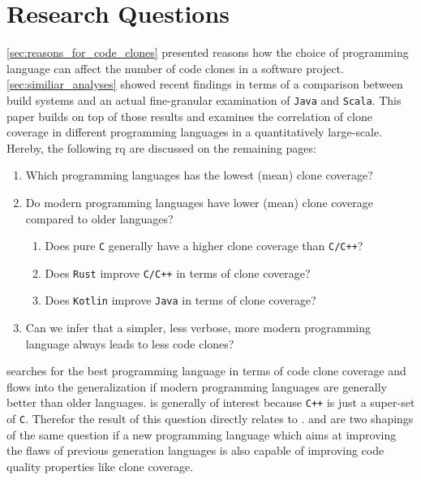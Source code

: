 
\section{Research Questions}
\label{sec:research_question}

\autoref{sec:reasons_for_code_clones} presented reasons how the choice of programming language can affect the number of code clones in a software project. \autoref{sec:similiar_analyses} showed recent findings in terms of a comparison between build systems and an actual fine-granular examination of \texttt{Java} and \texttt{Scala}.
This paper builds on top of those results and examines the correlation of clone coverage in different programming languages in a quantitatively large-scale. Hereby, the following \ac{rq} are discussed on the remaining pages:

\begin{enumerate}
	\item Which programming languages has the lowest (mean) clone coverage? \label{question:clone_coverage_lowest}
	\item Do modern programming languages have lower (mean) clone coverage compared to older languages? \label{question:comparing_age}
	\begin{enumerate}
		\item Does pure \texttt{C} generally have a higher clone coverage than \texttt{C/C++}? \label{question:compare_c_cpp}
		\item Does \texttt{Rust} improve \texttt{C/C++} in terms of clone coverage? \label{question:compare_rust_c}
		\item Does \texttt{Kotlin} improve \texttt{Java} in terms of clone coverage? \label{question:compare_kotlin_java}
	\end{enumerate}
	\item Can we infer that a simpler, less verbose, more modern programming language always leads to less code clones? \label{question:always_less_clones}
\end{enumerate}

 searches for the best programming language in terms of code clone coverage and flows into the generalization if modern programming languages are generally better than older languages.
 is generally of interest because \texttt{C++} is just a super-set of \texttt{C}. Therefor the result of this question directly relates to .  and  are two shapings of the same question if a new programming language which aims at improving the flaws of previous generation languages is also capable of improving code quality properties like clone coverage.

